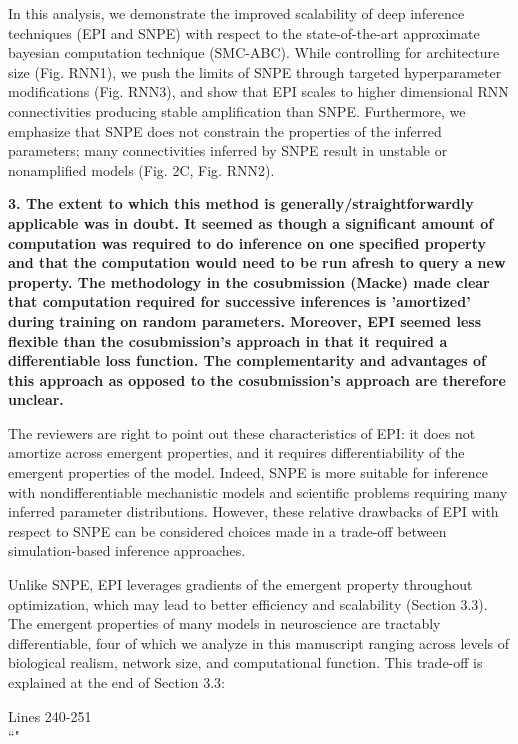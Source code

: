 \documentclass[11pt,a4paper]{article}
\begin{document}
In this analysis, we demonstrate the improved scalability of deep inference techniques (EPI and SNPE) with respect to the state-of-the-art approximate bayesian computation technique (SMC-ABC).
While controlling for architecture size (Fig. RNN1), we push the limits of SNPE through targeted hyperparameter modifications (Fig. RNN3), and show that EPI scales to higher dimensional RNN connectivities producing stable amplification than SNPE.
Furthermore, we emphasize that SNPE does not constrain the properties of the inferred parameters; many connectivities inferred by SNPE result in unstable or nonamplified models (Fig. 2C, Fig. RNN2).

\textbf{3. The extent to which this method is generally/straightforwardly applicable was in doubt. It seemed as though a significant amount of computation was required to do inference on one specified property and that the computation would need to be run afresh to query a new property. The methodology in the cosubmission (Macke) made clear that computation required for successive inferences is 'amortized' during training on random parameters. Moreover, EPI seemed less flexible than the cosubmission's approach in that it required a differentiable loss function. The complementarity and advantages of this approach as opposed to the cosubmission's approach are therefore unclear. } 

The reviewers are right to point out these characteristics of EPI: it does not amortize across emergent properties, and it requires differentiability of the emergent properties of the model. 
Indeed, SNPE is more suitable for inference with nondifferentiable mechanistic models and scientific problems requiring many inferred parameter distributions.  
However, these relative drawbacks of EPI with respect to SNPE can be considered choices made in a trade-off between simulation-based inference approaches.  

Unlike SNPE, EPI leverages gradients of the emergent property throughout optimization, which may lead to better efficiency and scalability (Section 3.3).  
The emergent properties of many models in neuroscience are tractably differentiable, four of which we analyze in this manuscript ranging across levels of biological realism, network size, and computational function.
This trade-off is explained at the end of Section 3.3:

\begin{displayquote}
Lines 240-251\\
``"
\end{displayquote}
\end{document}
